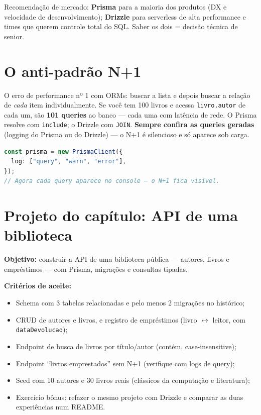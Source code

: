 \begin{caixadica}
Recomendação de mercado: \textbf{Prisma} para a maioria dos produtos (DX e
velocidade de desenvolvimento); \textbf{Drizzle} para serverless de alta
performance e times que querem controle total do SQL. Saber os dois = decisão
técnica de senior.
\end{caixadica}

\section{O anti-padrão N+1}

O erro de performance nº 1 com ORMs: buscar a lista e depois buscar a relação
de \emph{cada} item individualmente. Se você tem 100 livros e acessa
\texttt{livro.autor} de cada um, são \textbf{101 queries} ao banco — cada uma
com latência de rede. O Prisma resolve com \texttt{include}; o Drizzle com
\texttt{JOIN}. \textbf{Sempre confira as queries geradas} (logging do Prisma
ou do Drizzle) — o N+1 é silencioso e só aparece sob carga.

\begin{lstlisting}[style=livro, language=TypeScript,
  caption={Ligando o log de queries (Prisma).}, label={list:orm-log}]
const prisma = new PrismaClient({
  log: ["query", "warn", "error"],
});
// Agora cada query aparece no console — o N+1 fica visível.
\end{lstlisting}

\section{Projeto do capítulo: API de uma biblioteca}
\label{sec:projeto13}

\begin{caixaprojeto}
\textbf{Objetivo:} construir a API de uma biblioteca pública — autores, livros
e empréstimos — com Prisma, migrações e consultas tipadas.

\textbf{Critérios de aceite:}
\begin{itemize}[leftmargin=*, itemsep=0.2em]
  \item Schema com 3 tabelas relacionadas e pelo menos 2 migrações no histórico;
  \item CRUD de autores e livros, e registro de empréstimos (livro $\leftrightarrow$ leitor, com \texttt{dataDevolucao});
  \item Endpoint de busca de livros por título/autor (contém, case-insensitive);
  \item Endpoint ``livros emprestados'' sem N+1 (verifique com logs de query);
  \item Seed com 10 autores e 30 livros reais (clássicos da computação e literatura);
  \item Exercício bônus: refazer o mesmo projeto com Drizzle e comparar as duas experiências num README.
\end{itemize}
\end{caixaprojeto}


